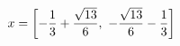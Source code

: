 \documentclass[preview]{standalone}
\begin{document}
\begin{align*}
\special{dvisvgm:raw <g id='unique000'>}x=\left[ - \frac{1}{3} + \frac{\sqrt{13}}{6}, \  - \frac{\sqrt{13}}{6} - \frac{1}{3}\right]\special{dvisvgm:raw </g>}
\end{align*}
\end{document}
